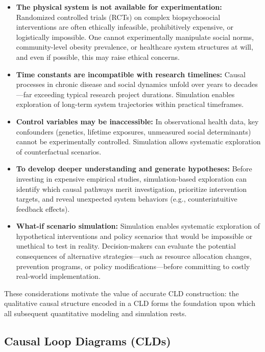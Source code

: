 \begin{itemize}
    \item \textbf{The physical system is not available for experimentation:} Randomized controlled trials (RCTs) on complex biopsychosocial interventions are often ethically infeasible, prohibitively expensive, or logistically impossible. One cannot experimentally manipulate social norms, community-level obesity prevalence, or healthcare system structures at will, and even if possible, this may raise ethical concerns.
    \item \textbf{Time constants are incompatible with research timelines:} Causal processes in chronic disease and social dynamics unfold over years to decades---far exceeding typical research project durations. Simulation enables exploration of long-term system trajectories within practical timeframes.
    \item \textbf{Control variables may be inaccessible:} In observational health data, key confounders (genetics, lifetime exposures, unmeasured social determinants) cannot be experimentally controlled. Simulation allows systematic exploration of counterfactual scenarios.
    \item \textbf{To develop deeper understanding and generate hypotheses:} Before investing in expensive empirical studies, simulation-based exploration can identify which causal pathways merit investigation, prioritize intervention targets, and reveal unexpected system behaviors (e.g., counterintuitive feedback effects).
    \item \textbf{What-if scenario simulation:} Simulation enables systematic exploration of hypothetical interventions and policy scenarios that would be impossible or unethical to test in reality. Decision-makers can evaluate the potential consequences of alternative strategies---such as resource allocation changes, prevention programs, or policy modifications---before committing to costly real-world implementation.
\end{itemize}

\noindent
These considerations motivate the value of accurate CLD construction: the qualitative causal structure encoded in a CLD forms the foundation upon which all subsequent quantitative modeling and simulation rests.

\subsection{Causal Loop Diagrams (CLDs)}
\label{sec:background_clds}

